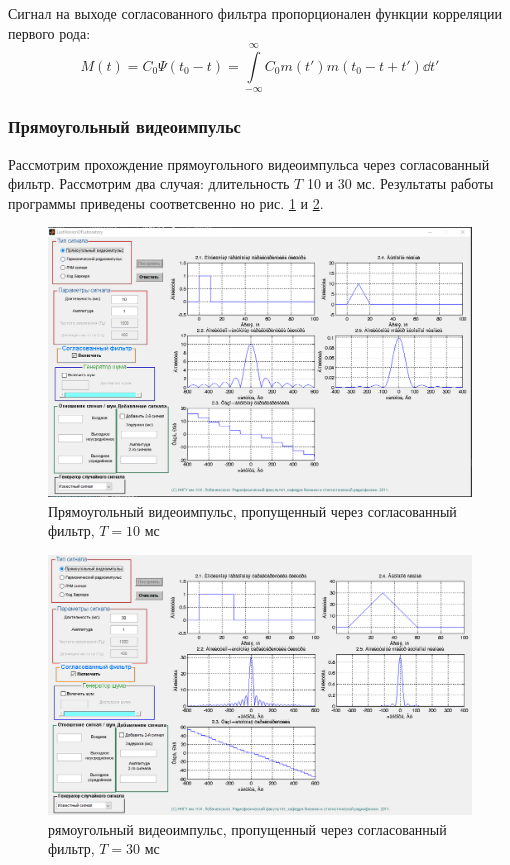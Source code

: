 Сигнал на выходе согласованного фильтра пропорционален функции корреляции первого рода:
\begin{equation}
    M(t) = C_0 \Psi (t_0-t) = \int \limits_{-\infty}^{\infty} C_0 m(t')m(t_0-t+t') \dd t'
    \label{eq:}
\end{equation}

\subsubsection{Прямоугольный видеоимпульс}
Рассмотрим прохождение прямоугольного видеоимпульса через согласованный фильтр. Рассмотрим два случая: длительность $T$
10 и 30 мс. Результаты работы программы приведены соответсвенно но рис. \ref{fig:task_2_1_10} и \ref{fig:task_2_1_30}.
\begin{figure}[H]
    \centering
    \includegraphics[width=0.9\linewidth]{imgs/task_2/t2s1_10.png}
    \caption{Прямоугольный видеоимпульс, пропущенный через согласованный фильтр, $T = 10$ мс}
    \label{fig:task_2_1_10}
\end{figure}
\begin{figure}[H]
    \centering
    \includegraphics[width=0.9\linewidth]{imgs/task_2/t2s1_30.png}
    \caption{рямоугольный видеоимпульс, пропущенный через согласованный фильтр, $T = 30$ мс}
    \label{fig:task_2_1_30}
\end{figure}

